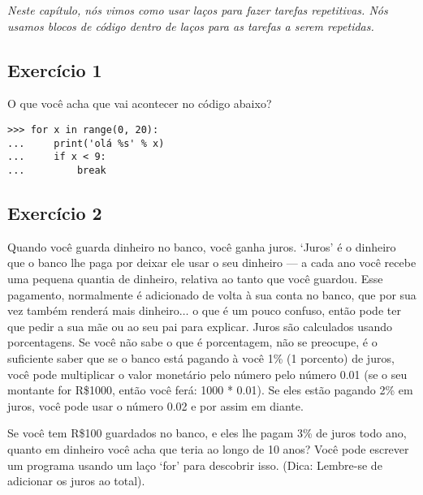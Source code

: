 \emph{Neste capítulo, nós vimos como usar laços para fazer tarefas repetitivas. Nós usamos blocos de código dentro de laços para as tarefas a serem repetidas.}

\subsection*{Exercício 1}
O que você acha que vai acontecer no código abaixo?

\begin{listing}
\begin{verbatim}
>>> for x in range(0, 20):
...     print('olá %s' % x)
...     if x < 9:
...         break
\end{verbatim}
\end{listing}

\subsection*{Exercício 2}
Quando você guarda dinheiro no banco, você ganha juros. `Juros' é o dinheiro que o banco lhe paga por deixar ele usar o seu dinheiro --- a cada ano você recebe uma pequena quantia de dinheiro, relativa ao tanto que você guardou. Esse pagamento, normalmente é adicionado de volta à sua conta no banco, que por sua vez também renderá mais dinheiro$\ldots$ o que é um pouco confuso, então pode ter que pedir a sua mãe ou ao seu pai para explicar.
Juros são calculados usando porcentagens. Se você não sabe o que é porcentagem, não se preocupe, é o suficiente saber que se o banco está pagando à você 1\% (1 porcento) de juros, você pode multiplicar o valor monetário pelo número pelo número 0.01 (se o seu montante for R\$1000, então você ferá: 1000 * 0.01). Se eles estão pagando 2\% em juros, você pode usar o número 0.02 e por assim em diante.

Se você tem R\$100 guardados no banco, e eles lhe pagam 3\% de juros todo ano, quanto em dinheiro você acha que teria ao longo de 10 anos? Você pode escrever um programa usando um laço `for' para descobrir isso. (Dica: Lembre-se de adicionar os juros ao total).
\newpage
